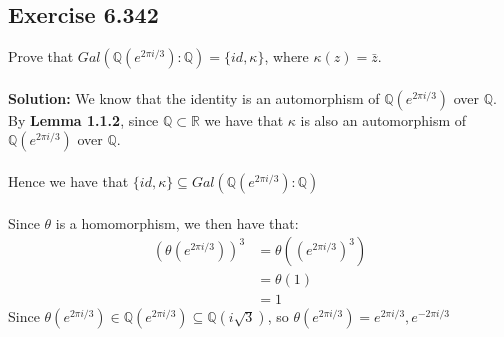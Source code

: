 \documentclass{article}
\begin{document}
\subsection*{Exercise 6.342}
Prove that $Gal(\mathbb{Q}(e^{2\pi i /3}):\mathbb{Q}) = \{ id, \kappa\}$, where $\kappa(z)=\bar z$.
\\\\
\textbf{Solution:}
We know that the identity is an automorphism of $\mathbb{Q}(e^{2\pi i /3})$ over $\mathbb{Q}$. 
By \textbf{Lemma 1.1.2}, since $\mathbb{Q} \subset \mathbb{R}$ we have that $\kappa$ is also an automorphism of $\mathbb{Q}(e^{2\pi i /3})$ over $\mathbb{Q}$.
\\\\
Hence we have that $\{ id, \kappa\} \subseteq Gal(\mathbb{Q}(e^{2\pi i /3}):\mathbb{Q})$
\\\\
Since $\theta$ is a homomorphism, we then have that:
\begin{equation*}
    \begin{aligned}
        (\theta(e^{2\pi i /3}))^3 &= \theta((e^{2\pi i /3})^3)\\
        &= \theta(1)\\
        &= 1
    \end{aligned}
\end{equation*}
Since $\theta(e^{2\pi i /3}) \in \mathbb{Q}(e^{2\pi i /3}) \subseteq \mathbb{Q}(i \sqrt{3})$, so $\theta(e^{2\pi i /3}) = e^{2\pi i /3},e^{-2\pi i /3}$
\end{document}
